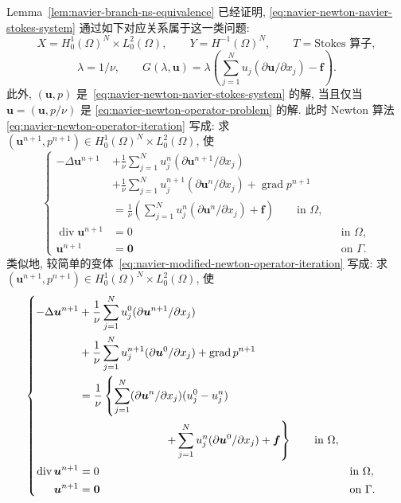 Lemma~\ref{lem:navier-branch-ns-equivalence} 已经证明,
\eqref{eq:navier-newton-navier-stokes-system} 通过如下对应关系属于这一类问题:
\[
X=H_0^1(\Omega)^N\times L_0^2(\Omega),
\qquad Y=H^{-1}(\Omega)^N,
\qquad T=\text{Stokes 算子},
\]
\[
\lambda=1/\nu,
\qquad
G(\lambda,\boldsymbol u)=\lambda
\left(\sum_{j=1}^Nu_j(\partial\boldsymbol u/\partial x_j)-\boldsymbol f\right).
\]
此外, $(\boldsymbol u,p)$ 是 \,\eqref{eq:navier-newton-navier-stokes-system} 的解,
当且仅当 $\mathbf u=(\boldsymbol u,p/\nu)$ 是
\eqref{eq:navier-newton-operator-problem} 的解. 此时 Newton 算法
\eqref{eq:navier-newton-operator-iteration} 写成:
求 $(\boldsymbol u^{n+1},p^{n+1})\in H_0^1(\Omega)^N\times L_0^2(\Omega)$, 使
\begin{equation}
\label{eq:navier-newton-navier-stokes-iteration}
\left\{
\begin{aligned}
-\Delta\boldsymbol u^{n+1}
&+\frac1\nu\sum_{j=1}^N
u_j^n(\partial\boldsymbol u^{n+1}/\partial x_j)\\
&+\frac1\nu\sum_{j=1}^N
u_j^{n+1}(\partial\boldsymbol u^n/\partial x_j)
+\operatorname{grad}p^{n+1}\\
&=\frac1\nu\left(
\sum_{j=1}^Nu_j^n(\partial\boldsymbol u^n/\partial x_j)+\boldsymbol f
\right)\qquad\text{in }\Omega,\\
\operatorname{div}\boldsymbol u^{n+1}&=0&&\text{in }\Omega,\\
\boldsymbol u^{n+1}&=\boldsymbol0&&\text{on }\Gamma.
\end{aligned}
\right.
\end{equation}
类似地, 较简单的变体 \,\eqref{eq:navier-modified-newton-operator-iteration} 写成:
求 $(\boldsymbol u^{n+1},p^{n+1})\in H_0^1(\Omega)^N\times L_0^2(\Omega)$, 使
\begin{equation}
\label{eq:navier-modified-newton-navier-stokes-iteration}
\left\{
\begin{aligned}
-\Delta\boldsymbol u^{n+1}
&+\frac1\nu\sum_{j=1}^N
u_j^0(\partial\boldsymbol u^{n+1}/\partial x_j)\\
&+\frac1\nu\sum_{j=1}^N
u_j^{n+1}(\partial\boldsymbol u^0/\partial x_j)
+\operatorname{grad}p^{n+1}\\
&=\frac1\nu\left\{
\sum_{j=1}^N(\partial\boldsymbol u^n/\partial x_j)(u_j^0-u_j^n)\right.\\
&\hspace{27mm}\left.
+\sum_{j=1}^Nu_j^n(\partial\boldsymbol u^0/\partial x_j)+\boldsymbol f
\right\}\qquad\text{in }\Omega,\\
\operatorname{div}\boldsymbol u^{n+1}&=0&&\text{in }\Omega,\\
\boldsymbol u^{n+1}&=\boldsymbol0&&\text{on }\Gamma.
\end{aligned}
\right.
\end{equation}
